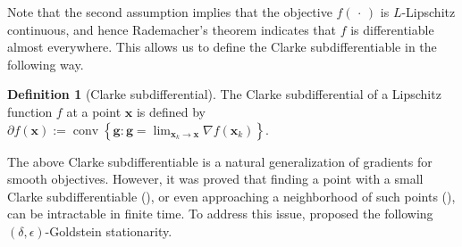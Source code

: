 \documentclass{article}
\def\vg{{\bm{g}}}
\def\vx{{\bm{x}}}
\def\vy{{\bm{y}}}
\newcommand{\E}{\mathbb{E}}
\theoremstyle{definition}
\newtheorem{dfn}{Definition}[section]
\theoremstyle{remark}
\begin{document}
	
	
	Note that the second assumption implies that the objective
	$f(\,\cdot\,)$ is $L$-Lipschitz continuous, and hence Rademacher's theorem indicates that $f$ is differentiable almost everywhere. This allows us to define the Clarke subdifferentiable \citep{clarke1990optimization} in the following way.
	
	\begin{dfn}[Clarke subdifferential] \label{dfn:Clk}
		The Clarke subdifferential of  a Lipschitz function $f$ at a point $\vx$ is defined by $\partial f(\vx):=\operatorname{conv}\left\{ \vg: \vg = \lim_{\vx_k \rightarrow \vx} \nabla f(\vx_k)\right\}$.
	\end{dfn}
	
	The above Clarke subdifferentiable is a natural generalization of gradients for smooth objectives. However, it was proved that finding a point with a small Clarke subdifferentiable (\citep[Theorem 2]{zhang2020complexity}), or even approaching a neighborhood of such points (\citep[Theorem 1]{kornowski2022oracle}), can be intractable in finite time. To address this issue, \citet{zhang2020complexity} proposed the following $(\delta,\epsilon)$-Goldstein stationarity. 
	
\end{document}
